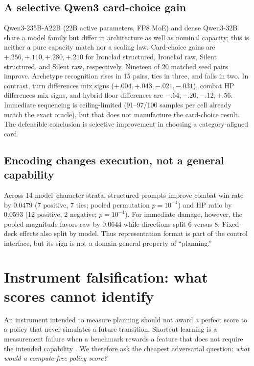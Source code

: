 \documentclass{article}
\begin{document}
\subsection{A selective Qwen3 card-choice gain}

Qwen3-235B-A22B (22B active parameters, FP8 MoE) and dense Qwen3-32B share a model
family but differ in architecture as well as nominal capacity; this is neither a pure
capacity match nor a scaling law. Card-choice gains are $+.256,+.110,+.280,+.210$ for Ironclad structured,
Ironclad raw, Silent structured, and Silent raw, respectively. Nineteen of 20 matched
seed pairs improve. Archetype recognition rises in 15 pairs, ties in three, and falls in
two. In contrast, turn differences mix signs ($+.004,+.043,-.021,-.031$), combat HP
differences mix signs, and hybrid floor differences are $-.64,-.20,-.12,+.56$.
Immediate sequencing is ceiling-limited (91--97/100 samples per cell already match the
exact oracle), but that does not manufacture the card-choice result. The defensible
conclusion is selective improvement in choosing a category-aligned card.

\subsection{Encoding changes execution, not a general capability}

Across 14 model--character strata, structured prompts improve combat win rate by
$0.0479$ (7 positive, 7 ties; pooled permutation $p=10^{-4}$) and HP ratio by $0.0593$
(12 positive, 2 negative; $p=10^{-4}$). For immediate damage, however, the pooled
magnitude favors raw by $0.0644$ while directions split 6 versus 8. Fixed-deck effects
also split by model. Thus representation format is part of the control interface, but
its sign is not a domain-general property of ``planning.''

\section{Instrument falsification: what scores cannot identify}

An instrument intended to measure planning should not award a perfect score to a
policy that never simulates a future transition. Shortcut learning is a measurement
failure when a benchmark rewards a feature that does not require the intended
capability \citep{geirhos2020shortcut}. We therefore ask the cheapest adversarial
question: \emph{what would a compute-free policy score?}
\end{document}
